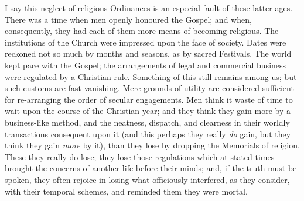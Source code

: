 I say this neglect of religious Ordinances is an especial fault of
these latter ages. There was a time when men openly honoured the Gospel;
and when, consequently, they had each of them more means of becoming
religious. The institutions of the Church were impressed upon the face
of society. Dates were reckoned not so much by months and seasons, as by
sacred Festivals. The world kept pace with the Gospel; the arrangements
of legal and commercial business were regulated by a Christian rule.
Something of this still remains among us; but such customs are fast
vanishing. Mere grounds of utility are considered sufficient for
re-arranging the order of secular engagements. Men think it waste of time
to wait upon the course of the Christian year; and they think they gain
more by a business-like method, and the neatness, dispatch, and
clearness in their worldly transactions consequent upon it (and this
perhaps they really \emph{do} gain, but they think they gain \emph{more}
by it), than they lose by dropping the Memorials of religion. These they
really do lose; they lose those regulations which at stated times
brought the concerns of another life before their minds; and, if the
truth must be spoken, they often rejoice in losing what officiously
interfered, as they consider, with their temporal schemes, and reminded
them they were mortal.

